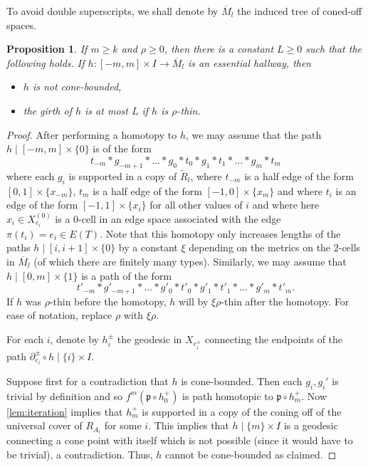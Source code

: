 \documentclass[11pt, a4paper]{amsart}
\newtheorem{proposition}[theorem]{Proposition}
\theoremstyle{definition}
\newcommand{\wt}[1]{\widetilde{ #1 }}
\begin{document}
To avoid double superscripts, we shall denote by $\overline{M}_l$ the induced tree of coned-off spaces.

\begin{proposition}
\label{prop:hallways}
If $m\geqslant k$ and $\rho\geqslant 0$, then there is a constant $L\geqslant 0$ such that the following holds. If $h\colon [-m, m]\times I\to \overline{M}_{l}$ is an essential hallway, then
\begin{itemize}
\item $h$ is not cone-bounded,
\item the girth of $h$ is at most $L$ if $h$ is $\rho$-thin.
\end{itemize}
\end{proposition}

\begin{proof}
After performing a homotopy to $h$, we may assume that the path $h\mid[-m, m]\times \{0\}$ is of the form
\[
t_{-m}*g_{-m+1}*\ldots*g_0*t_0*g_1*t_1*\ldots*g_m*t_m
\]
where each $g_i$ is supported in a copy of $\wt{R}_{l}$, where $t_{-m}$ is a half edge of the form $[0, 1]\times\{x_{-m}\}$, $t_m$ is a half edge of the form $[-1, 0]\times\{x_m\}$ and where $t_i$ is an edge of the form $[-1, 1]\times\{x_i\}$ for all other values of $i$ and where here $x_i\in X_{e_i}^{(0)}$ is a 0-cell in an edge space associated with the edge $\pi(t_i) = e_i\in E(T)$. Note that this homotopy only increases lengths of the paths $h\mid[i, i+1]\times\{0\}$ by a constant $\xi$ depending on the metrics on the 2-cells in $\overline{M}_l$ (of which there are finitely many types). Similarly, we may assume that $h\mid[0, m]\times \{1\}$ is a path of the form
\[
t'_{-m}*g'_{-m+1}*\ldots*g'_0*t'_0*g'_1*t'_1*\ldots*g'_m*t'_m.
\]
If $h$ was $\rho$-thin before the homotopy, $h$ will by $\xi\rho$-thin after the homotopy. For ease of notation, replace $\rho$ with $\xi\rho$.

For each $i$, denote by $h_i^{\pm}$ the geodesic in $X_{e_i^{\pm}}$ connecting the endpoints of the path $\partial^{\pm}_{e_i}\circ h\mid\{i\}\times I$.

Suppose first for a contradiction that $h$ is cone-bounded. Then each $g_i, g_i'$ is trivial by definition and so $f^m(\mathfrak{p}\circ h_0^+)$ is path homotopic to $\mathfrak{p}\circ h_m^+$. Now \cref{lem:iteration} implies that $h_m^+$ is supported in a copy of the coning off of the universal cover of $R_{A_i}$ for some $i$. This implies that $h\mid\{m\}\times I$ is a geodesic connecting a cone point with itself which is not possible (since it would have to be trivial), a contradiction. Thus, $h$ cannot be cone-bounded as claimed.


\end{proof}
\end{document}
